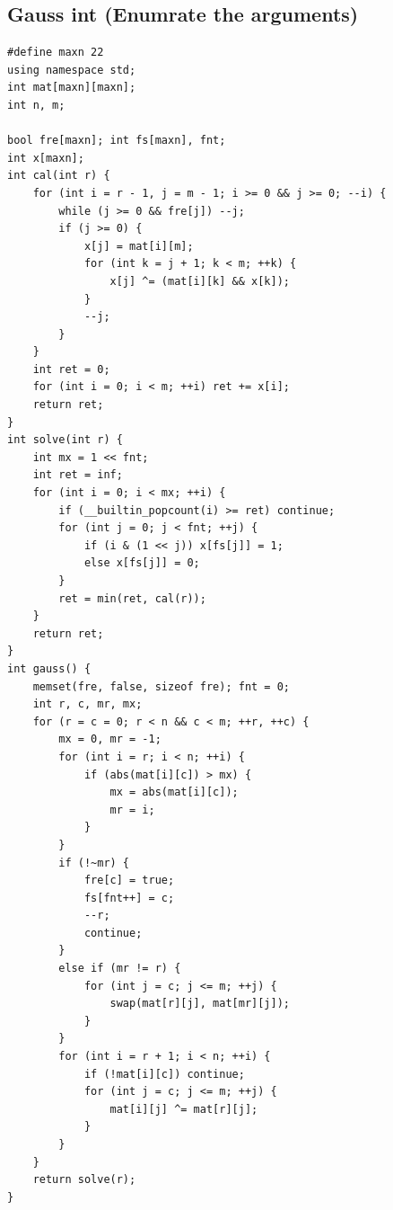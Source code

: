 \documentclass[a4paper]{article}
\begin{document}
\begin{CJK*}{UTF8}{gbsn}
\begin{multicols}{3}
\begin{flushleft}
\subsection{Gauss int (Enumrate the arguments)}
\begin{lstlisting}
#define maxn 22
using namespace std;
int mat[maxn][maxn];
int n, m;

bool fre[maxn]; int fs[maxn], fnt;
int x[maxn];
int cal(int r) {
    for (int i = r - 1, j = m - 1; i >= 0 && j >= 0; --i) {
        while (j >= 0 && fre[j]) --j;
        if (j >= 0) {
            x[j] = mat[i][m];
            for (int k = j + 1; k < m; ++k) {
                x[j] ^= (mat[i][k] && x[k]);
            }
            --j;
        }
    }
    int ret = 0;
    for (int i = 0; i < m; ++i) ret += x[i];
    return ret;
}
int solve(int r) {
    int mx = 1 << fnt;
    int ret = inf;
    for (int i = 0; i < mx; ++i) {
        if (__builtin_popcount(i) >= ret) continue;
        for (int j = 0; j < fnt; ++j) {
            if (i & (1 << j)) x[fs[j]] = 1;
            else x[fs[j]] = 0;
        }
        ret = min(ret, cal(r));
    }
    return ret;
}
int gauss() {
    memset(fre, false, sizeof fre); fnt = 0;
    int r, c, mr, mx;
    for (r = c = 0; r < n && c < m; ++r, ++c) {
        mx = 0, mr = -1;
        for (int i = r; i < n; ++i) {
            if (abs(mat[i][c]) > mx) {
                mx = abs(mat[i][c]);
                mr = i;
            }
        }
        if (!~mr) {
            fre[c] = true;
            fs[fnt++] = c;
            --r;
            continue;
        }
        else if (mr != r) {
            for (int j = c; j <= m; ++j) {
                swap(mat[r][j], mat[mr][j]);
            }
        }
        for (int i = r + 1; i < n; ++i) {
            if (!mat[i][c]) continue;
            for (int j = c; j <= m; ++j) {
                mat[i][j] ^= mat[r][j];
            }
        }
    }
    return solve(r);
}
\end{lstlisting}


\end{flushleft}
\end{multicols}
\end{CJK*}
\end{document}
